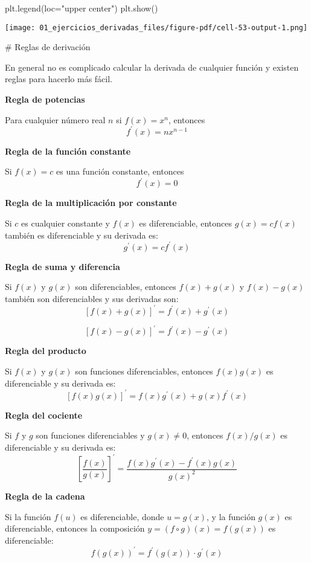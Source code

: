 \documentclass[
  letterpaper,
  DIV=11,
  numbers=noendperiod]{scrreprt}
\newenvironment{Shaded}{\begin{snugshade}}{\end{snugshade}}
\newcommand{\NormalTok}[1]{\textcolor[rgb]{0.00,0.23,0.31}{#1}}
\newcommand{\OperatorTok}[1]{\textcolor[rgb]{0.37,0.37,0.37}{#1}}
\newcommand{\StringTok}[1]{\textcolor[rgb]{0.13,0.47,0.30}{#1}}
\begin{document}
\begin{Shaded}
\begin{Highlighting}[]
\NormalTok{plt.legend(loc}\OperatorTok{=}\StringTok{"upper center"}\NormalTok{)}
\NormalTok{plt.show()}
\end{Highlighting}
\end{Shaded}

\texttt{[image: 01\_ejercicios\_derivadas\_files/figure-pdf/cell-53-output-1.png]}

\# Reglas de derivación

En general no es complicado calcular la derivada de cualquier función y
existen reglas para hacerlo más fácil.

\textbf{Regla de potencias}

Para cualquier número real \(n\) si \(f(x)= x^n\), entonces \[
f^\prime(x) = n x^{n-1}
\]

\textbf{Regla de la función constante}

Si \(f(x)=c\) es una función constante, entonces \[ 
f^\prime(x)=0 
\]

\textbf{Regla de la multiplicación por constante}

Si \(c\) es cualquier constante y \(f(x)\) es diferenciable, entonces
\(g(x)= c f(x)\) también es diferenciable y su derivada es: \[ 
g^\prime(x) = c f^\prime(x) 
\]

\textbf{Regla de suma y diferencia}

Si \(f(x)\) y \(g(x)\) son diferenciables, entonces \(f(x) + g(x)\) y
\(f(x) - g(x)\) también son diferenciables y sus derivadas son: \[ 
[f(x)+ g(x)]^\prime = f^\prime(x) + g^\prime(x) 
\]

\[ 
[f(x)- g(x)]^\prime=f^\prime(x) - g^\prime(x) 
\]

\textbf{Regla del producto}

Si \(f(x)\) y \(g(x)\) son funciones diferenciables, entonces
\(f(x)g(x)\) es diferenciable y su derivada es: \[ 
[f(x) g(x)]^\prime= f(x)g^\prime(x) + g(x)f^\prime(x) 
\]

\textbf{Regla del cociente}

Si \(f\) y \(g\) son funciones diferenciables y \(g(x) \neq 0\),
entonces \(f(x)/g(x)\) es diferenciable y su derivada es: \[  
\left[\frac{f(x)}{g(x)} \right]^\prime = \frac{f(x)g^\prime(x)- f^\prime(x)g(x) }{g(x)^2}
\]

\textbf{Regla de la cadena}

Si la función \(f(u)\) es diferenciable, donde \(u = g(x)\), y la
función \(g(x)\) es diferenciable, entonces la composición
\(y=(f \circ g)(x)= f(g(x))\) es diferenciable: \[ 
f(g(x))^\prime = f^\prime(g(x)) \cdot g^\prime(x)  
\]
\end{document}
